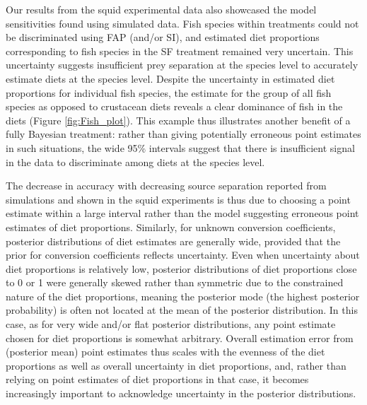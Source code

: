 \documentclass[fleqn,10pt]{wlpeerj}
\begin{document}
Our results from the squid experimental data also showcased the model
sensitivities found using simulated data. Fish species within treatments could
not be discriminated using FAP (and/or SI), and estimated diet
proportions corresponding to fish species in the SF treatment remained
very uncertain. This uncertainty suggests insufficient prey
separation at the species level to accurately estimate diets at the
species level. Despite the uncertainty in estimated diet proportions for
individual fish species, the estimate for the group of all
fish species as opposed to crustacean diets reveals a clear dominance of
fish in the diets (Figure \ref{fig:Fish_plot}). This example thus illustrates another
benefit of a fully Bayesian treatment: rather than giving
potentially erroneous point estimates in such situations, the wide
95\% intervals suggest that there is insufficient signal in the
data to discriminate among diets at the species level. 

The decrease in accuracy with decreasing source separation reported from simulations and shown in the
squid experiments is thus due to choosing a point estimate within a
large interval rather
than the model suggesting erroneous point estimates of diet proportions. Similarly, for unknown conversion coefficients, posterior
distributions of diet estimates are generally wide, provided that the
prior for conversion coefficients reflects uncertainty. Even when
uncertainty about diet proportions is relatively low, posterior distributions of diet proportions close to 0 or
1 were generally skewed rather than symmetric due to the constrained nature of the diet
proportions, meaning the posterior
mode (the highest posterior probability) is often not located at the
mean of the posterior distribution. In this case, as for very wide and/or flat
posterior distributions, any point estimate
chosen for diet proportions is somewhat arbitrary. Overall estimation error from (posterior mean) point
estimates thus scales with the evenness of the diet proportions as
well as overall uncertainty in diet proportions, and,
rather than relying on point estimates of diet proportions in that case,
it becomes increasingly important to acknowledge uncertainty in the
posterior distributions.
\end{document}

